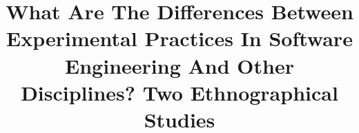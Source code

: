 %
%
%
%
%
%
\RequirePackage{fix-cm}
%
\documentclass[twocolumn]{svjour3}          %
%
\smartqed  %
%
\usepackage{graphicx}
%
%
%
\usepackage{graphicx}
\usepackage{tabulary}
\usepackage{multirow}
\usepackage{enumerate}
\usepackage{hyperref}
\usepackage{color}
\usepackage{soul}
\usepackage[latin1]{inputenc}
\usepackage{comment}
\usepackage{rotating}
\usepackage{framed}
\usepackage{tcolorbox}
\usepackage{graphicx}
\usepackage{lscape}
\usepackage{caption}
\usepackage[title]{appendix}

\newcommand{\rodrinote}[1]{\textcolor{blue}{[RODRI:#1]}}
\newcommand{\odnote}[1]{\textcolor{red}{[OD:#1]}}

%
%


\title{What Are The Differences Between Experimental Practices In Software Engineering And Other Disciplines? Two Ethnographical Studies}


